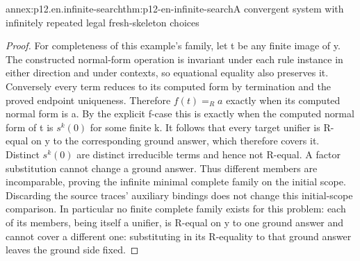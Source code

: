 \begin{annexitem}{annex:p12.en.infinite-search}{thm:p12-en-infinite-search}{A convergent system with infinitely repeated legal fresh-skeleton choices}
\begin{proof}
For completeness of this example's family, let t be any finite
image of y. The constructed normal-form operation is invariant
under each rule instance in either direction and under contexts,
so equational equality also preserves it. Conversely every term
reduces to its computed form by termination and the proved endpoint
uniqueness. Therefore \(f(t)=_Ra\) exactly when its computed
normal form is a. By the explicit f-case this is exactly when
the computed normal form of t is \(s^k(0)\) for some finite k.
It follows that every target unifier is R-equal on y to the
corresponding ground answer, which therefore covers it. Distinct
\(s^k(0)\) are distinct irreducible terms and hence not R-equal.
A factor substitution cannot change a ground answer. Thus different
members are incomparable, proving the infinite minimal complete
family on the initial scope. Discarding the source traces' auxiliary
bindings does not change this initial-scope comparison. In particular
no finite complete family exists for this problem: each of its
members, being itself a unifier, is R-equal on y to one ground
answer and cannot cover a different one: substituting in its
R-equality to that ground answer leaves the ground side fixed.
\end{proof}
\end{annexitem}
